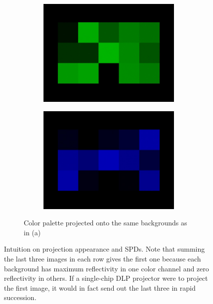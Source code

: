 \begin{figure}
\begin{subfigure}{\textwidth}
\begin{subfigure}{0.24\textwidth}
            \includegraphics[width=\textwidth]{images/02-spd_intuition-palette_green.jpg}
        \end{subfigure}
        \hfill
        \begin{subfigure}{0.24\textwidth}
            \centering
            \includegraphics[width=\textwidth]{images/02-spd_intuition-palette_blue.jpg}
        \end{subfigure}
        \caption{Color palette projected onto the same backgrounds as in (a)}
    \end{subfigure}
    \caption{Intuition on projection appearance and SPDs. Note that summing the last three images in each row gives the first one because each background has maximum reflectivity in one color channel and zero reflectivity in others. If a single-chip DLP projector were to project the first image, it would in fact send out the last three in rapid succession.}
    \label{fig:background_spd_intuition}
\end{figure}

